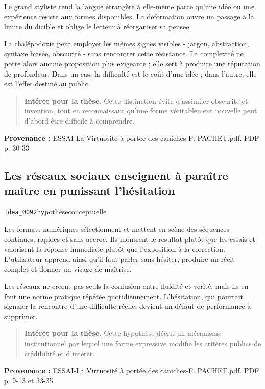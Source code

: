 \documentclass[10pt,a4paper]{article}
\begin{document}
Le grand styliste rend la langue étrangère à elle-même parce qu'une idée ou une expérience résiste aux formes disponibles. La déformation ouvre un passage à la limite du dicible et oblige le lecteur à réorganiser sa pensée.

La chalépodoxie peut employer les mêmes signes visibles - jargon, abstraction, syntaxe brisée, obscurité - sans rencontrer cette résistance. La complexité ne porte alors aucune proposition plus exigeante ; elle sert à produire une réputation de profondeur. Dans un cas, la difficulté est le coût d'une idée ; dans l'autre, elle est l'effet destiné au public.

\begin{quote}
\textbf{Intérêt pour la thèse.} Cette distinction évite d'assimiler obscurité et invention, tout en reconnaissant qu'une forme véritablement nouvelle peut d'abord être difficile à comprendre.
\end{quote}
{\footnotesize\color{metadata}\textbf{Provenance :} ESSAI-La Virtuosité à portée des caniches-F. PACHET.pdf. PDF p. 30-33\par}

\subsection{Les réseaux sociaux enseignent à paraître maître en punissant l'hésitation}
{\small\color{metadata} \texttt{idea\_0092}\quad\textbullet\quad hypothèse\quad\textbullet\quad conceptuelle\par}

Les formats numériques sélectionnent et mettent en scène des séquences continues, rapides et sans accroc. Ils montrent le résultat plutôt que les essais et valorisent la réponse immédiate plutôt que l'exposition à la correction. L'utilisateur apprend ainsi qu'il faut parler sans hésiter, produire un récit complet et donner un visage de maîtrise.

Les réseaux ne créent pas seuls la confusion entre fluidité et vérité, mais ils en font une norme pratique répétée quotidiennement. L'hésitation, qui pourrait signaler la rencontre d'une difficulté réelle, devient un défaut de performance à supprimer.

\begin{quote}
\textbf{Intérêt pour la thèse.} Cette hypothèse décrit un mécanisme institutionnel par lequel une forme expressive modifie les critères publics de crédibilité et d'intérêt.
\end{quote}
{\footnotesize\color{metadata}\textbf{Provenance :} ESSAI-La Virtuosité à portée des caniches-F. PACHET.pdf. PDF p. 9-13 et 33-35\par}
\end{document}
